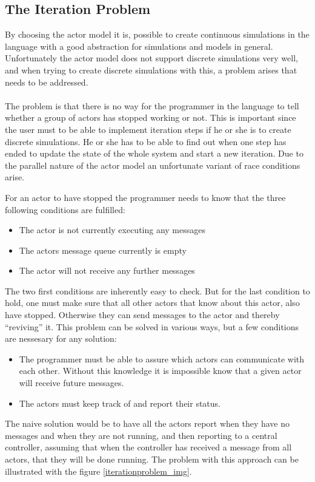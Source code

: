 \subsection{The Iteration Problem}
By choosing the actor model it is, possible to create continuous simulations in the language with a good abstraction for simulations and models in general. Unfortunately the actor model does not support discrete simulations very well, and when trying to create discrete simulations with this, a problem arises that needs to be addressed. \\\\ 
The problem is that there is no way for the programmer in the language to tell whether a group of actors has stopped working or not. This is important since the user must to be able to implement iteration steps if he or she is to create discrete simulations. He or she has to be able to find out when one step has ended to update the state of the whole system and start a new iteration. Due to the parallel nature of the actor model an unfortunate variant of race conditions arise.

For an actor to have stopped the programmer needs to know that the three following conditions are fulfilled:
\begin{itemize}
\item The actor is not currently executing any messages
\item The actors message queue currently is empty
\item The actor will not receive any further messages
\end{itemize} 
The two first conditions are inherently easy to check. But for the last condition to hold, one must make sure that all other actors that know about this actor, also have stopped. Otherwise they can send messages to the actor and thereby \enquote{reviving} it. This problem can be solved in various ways, but a few conditions are nessesary for any solution:

\begin{itemize}
\item The programmer must be able to assure which actors can communicate with each other. Without this knowledge it is impossible know that a given actor will receive future messages.
\item The actors must keep track of and report their status.
\end{itemize} 
The naive solution would be to have all the actors report when they have no messages and when they are not running, and then reporting to a central controller, assuming that when the controller has received a message from all actors, that they will be done running. The problem with this approach can be illustrated with the figure \cref{iterationproblem_img}. 

